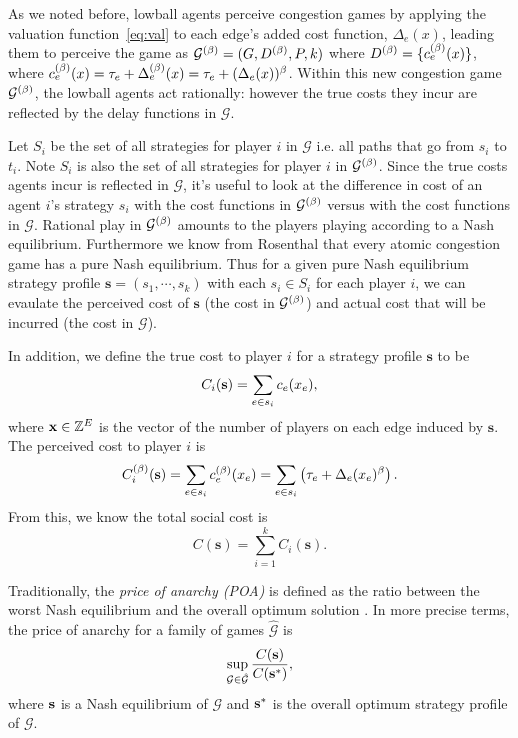 \documentclass[twoside]{article}
\begin{document}
\begin{multicols}{2}
As we noted before, lowball agents perceive congestion games by applying the valuation
function~\eqref{eq:val} to each edge's added cost function, $\Delta_e(x)$, leading them to
perceive the game as $\mathcal{G}^{(\beta)}= (G, D^{(\beta)}, P, k)$ where $D^{(\beta)} =
\{c_e^{(\beta)}(x)\}$, where $c_e^{(\beta)}(x) = \tau_e + \Delta_e^{(\beta)}(x) = \tau_e + (\Delta_e(x))^\beta$. Within this new
congestion game $\mathcal{G}^{(\beta)}$, the lowball agents act rationally: however
the true costs they incur are reflected by the delay functions in $\mathcal{G}$.   

Let $S_i$ be the set of all strategies for player $i$ in $\mathcal{G}$ i.e. all
paths that go from $s_i$ to $t_i$.  Note $S_i$ is also the set of all strategies for
player $i$ in $\mathcal{G}^{(\beta)}$.  Since the true costs agents incur is
reflected in $\mathcal{G}$, it's useful to look at the difference in cost of an
agent $i$'s strategy $s_i$ with the
cost functions in $\mathcal{G}^{(\beta)}$ versus with the cost functions in $\mathcal{G}$.
Rational play in $\mathcal{G}^{(\beta)}$ amounts to the players playing according to
a Nash equilibrium.  Furthermore we know from Rosenthal \cite{Rosenthal1973}
that every atomic congestion game has a pure Nash equilibrium.  Thus for a given
pure Nash equilibrium strategy profile $\mathbf{s} = (s_1, \cdots, s_k)$ with
each $s_i \in S_i$ for each player $i$, we can evaulate the perceived cost of
$\mathbf{s}$ (the cost in $\mathcal{G}^{(\beta)}$) and actual cost that will be
incurred (the cost in $\mathcal{G}$).

In addition, we define the true cost to player $i$ for a strategy profile
$\mathbf{s}$ to be
\[
  C_i(\mathbf{s}) = \sum\limits_{e \in s_i}c_e(x_e),
\]
where $\mathbf{x}
\in \mathbb{Z}^E$ is the vector of the number of players on each edge induced by
$\mathbf{s}$.  The perceived cost to player $i$ is
\[
  C^{(\beta)}_i(\mathbf{s}) = \sum\limits_{e \in s_i}c_e^{(\beta)}(x_e) = \sum\limits_{e \in
  s_i}\left(\tau_e + \Delta_e(x_e)^\beta\right).
\]
From this, we know the total social cost is
\[
  C(\mathbf{s}) = \sum_{i=1}^{k}C_i(\mathbf{s}).
\]
        
Traditionally, the \textit{price of anarchy (POA)} is defined as the ratio
between the worst Nash equilibrium and the overall optimum solution
\cite{Koutsoupias2009}.  In more precise terms, the price of anarchy for a
family of games $\hat{\mathcal{G}}$ is
\[
  \sup_{\mathcal{G} \in \hat{\mathcal{G}}} \frac{C(\mathbf{s})}{C(\mathbf{s}^*)},
\]
where $\mathbf{s}$ is a Nash equilibrium of $\mathcal{G}$ and $\mathbf{s}^*$ is the overall
optimum strategy profile of $\mathcal{G}$.


\end{multicols}
\end{document}
